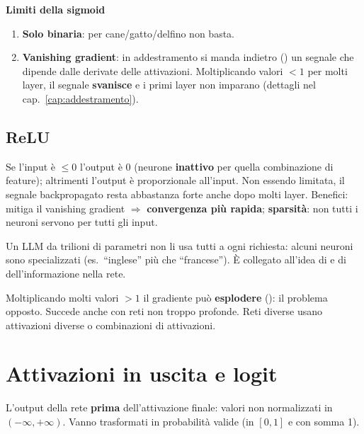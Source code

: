 \textbf{Limiti della sigmoid}
\begin{enumerate}
  \item \textbf{Solo binaria}: per cane/gatto/delfino non basta.
  \item \textbf{Vanishing gradient}: in addestramento si manda indietro () un segnale che dipende dalle
        derivate delle attivazioni. Moltiplicando valori $<1$ per molti layer, il segnale \textbf{svanisce} e i primi layer non
        imparano (dettagli nel cap.~\ref{cap:addestramento}).
\end{enumerate}

\subsection{ReLU}
Se l'input è $\leq 0$ l'output è 0 (neurone \textbf{inattivo} per quella combinazione di feature); altrimenti l'output è
proporzionale all'input. Non essendo limitata, il segnale backpropagato resta abbastanza forte anche dopo molti layer.
Benefici: mitiga il vanishing gradient $\Rightarrow$ \textbf{convergenza più rapida}; \textbf{sparsità}: non tutti i neuroni
servono per tutti gli input.

\begin{esempio}
Un LLM da trilioni di parametri non li usa tutti a ogni richiesta: alcuni neuroni sono specializzati (es.\ ``inglese'' più
che ``francese''). È collegato all'idea di  e di  dell'informazione nella rete.
\end{esempio}

\begin{attenzione}
Moltiplicando molti valori $>1$ il gradiente può \textbf{esplodere} (): il problema opposto.
Succede anche con reti non troppo profonde. Reti diverse usano attivazioni diverse o combinazioni di attivazioni.
\end{attenzione}

\section{Attivazioni in uscita e logit}
\begin{definizione}[logit]
L'output della rete \textbf{prima} dell'attivazione finale: valori non normalizzati in $(-\infty, +\infty)$.
Vanno trasformati in probabilità valide (in $[0,1]$ e con somma 1).
\end{definizione}

